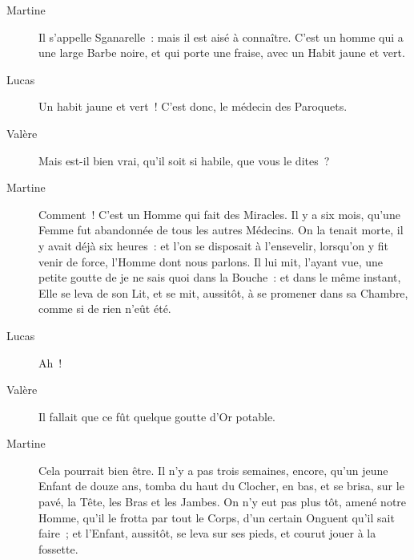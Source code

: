 \documentclass[french,twoside]{book} %
\begin{document}
 \begin{description} \item[Martine] 

Il s’appelle Sganarelle : mais il est aisé à connaître. C’est un homme qui a une large Barbe noire, et qui porte une fraise, avec un Habit jaune et vert.\end{description}
 \begin{description} \item[Lucas] 

Un habit jaune et vert ! C’est donc, le médecin des Paroquets.\end{description}
 \begin{description} \item[Valère] 

Mais est-il bien vrai, qu’il soit si habile, que vous le dites ?\end{description}
 \begin{description} \item[Martine] 

Comment ! C’est un Homme qui fait des Miracles. Il y a six mois, qu’une Femme fut abandonnée de tous les autres Médecins. On la tenait morte, il y avait déjà six heures : et l’on se disposait à l’ensevelir, lorsqu’on y fit venir de force, l’Homme dont nous parlons. Il lui mit, l’ayant vue, une petite goutte de je ne sais quoi dans la Bouche : et dans le même instant, Elle se leva de son Lit, et se mit, aussitôt, à se promener dans sa Chambre, comme si de rien n’eût été.\end{description}
 \begin{description} \item[Lucas] 

Ah !\end{description}
 \begin{description} \item[Valère] 

Il fallait que ce fût quelque goutte d’Or potable.\end{description}
 \begin{description} \item[Martine] 

Cela pourrait bien être. Il n’y a pas trois semaines, encore, qu’un jeune Enfant de douze ans, tomba du haut du Clocher, en bas, et se brisa, sur le pavé, la Tête, les Bras et les Jambes. On n’y eut pas plus tôt, amené notre Homme, qu’il le frotta par tout le Corps, d’un certain Onguent qu’il sait faire ; et l’Enfant, aussitôt, se leva sur ses pieds, et courut jouer à la fossette.\end{description}
\end{document}
